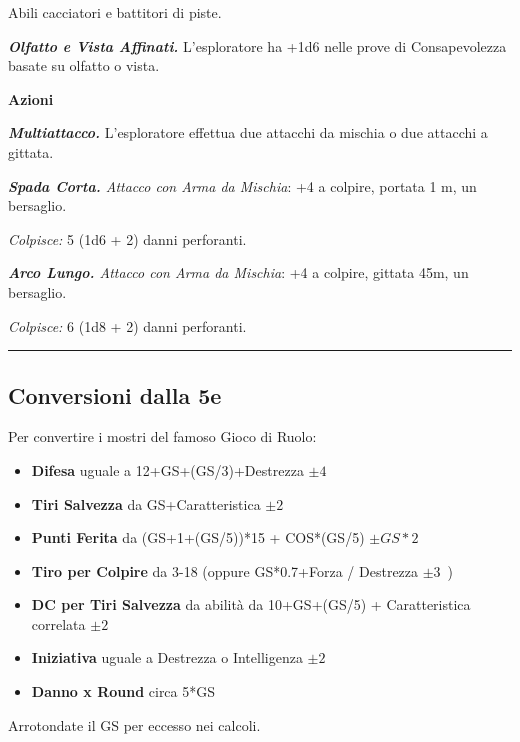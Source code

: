 \begin{multicols}{2}
{Abili cacciatori e battitori di piste.

\emph{\textbf{Olfatto e Vista Affinati.}} L'esploratore ha +1d6 nelle prove di Consapevolezza basate su olfatto o vista.

\textbf{Azioni}

\emph{\textbf{Multiattacco.}} L'esploratore effettua due attacchi da mischia o due attacchi a gittata.

\emph{\textbf{Spada Corta.} Attacco con Arma da Mischia}: +4 a colpire, portata 1 m, un bersaglio.

\emph{Colpisce:} 5 (1d6 + 2) danni perforanti.

\emph{\textbf{Arco Lungo.} Attacco con Arma da Mischia}: +4 a colpire, gittata 45m, un bersaglio.

\emph{Colpisce:} 6 (1d8 + 2) danni perforanti.

}  %


\rule{\linewidth}{2pt}

\subsection{Conversioni dalla 5e}

Per convertire i mostri del famoso Gioco di Ruolo:

\begin{itemize}[leftmargin=*] \setlength{\itemsep}{0pt}
\item \textbf{Difesa} uguale a 12+GS+(GS/3)+Destrezza $\pm4$\
\item \textbf{Tiri Salvezza} da GS+Caratteristica $\pm2$\
\item \textbf{Punti Ferita} da (GS+1+(GS/5))*15 + COS*(GS/5) $\pm GS*2$\
\item \textbf{Tiro per Colpire} da 3-18 (oppure GS*0.7+Forza / Destrezza $\pm3$\ )
\item \textbf{DC per Tiri Salvezza} da abilità da 10+GS+(GS/5) + Caratteristica correlata  $\pm2$\
\item \textbf{Iniziativa} uguale a Destrezza o Intelligenza  $\pm2$\
\item \textbf{Danno x Round} circa 5*GS
\end{itemize}

Arrotondate il GS per eccesso nei calcoli.

\end{multicols}

\vfill

